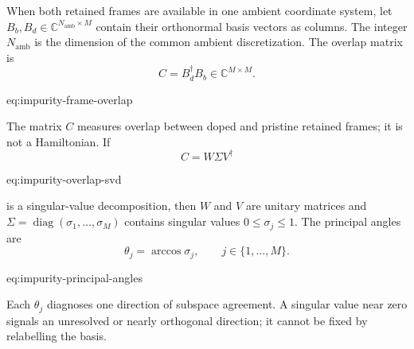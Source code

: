 When both retained frames are available in one ambient coordinate system, let
$B_b,B_d\in\mathbb C^{N_{\mathrm{amb}}\times M}$ contain their orthonormal
basis vectors as columns. The integer $N_{\mathrm{amb}}$ is the dimension of
the common ambient discretization. The overlap matrix is
\begin{equation}
    C=B_d^{\dagger}B_b\in\mathbb C^{M\times M}.
    \label{eq:impurity-frame-overlap}
\end{equation}
\begin{equationterms}{eq:impurity-frame-overlap}
\end{equationterms}
The matrix $C$ measures overlap between doped and pristine retained frames; it
is not a Hamiltonian. If
\begin{equation}
    C=W\Sigma V^{\dagger}
    \label{eq:impurity-overlap-svd}
\end{equation}
\begin{equationterms}{eq:impurity-overlap-svd}
\end{equationterms}
is a singular-value decomposition, then $W$ and $V$ are unitary matrices and
$\Sigma=\operatorname{diag}(\sigma_1,\ldots,\sigma_M)$ contains singular values
$0\leq\sigma_j\leq1$. The principal angles are
\begin{equation}
    \theta_j=\arccos\sigma_j,
    \qquad j\in\{1,\ldots,M\}.
    \label{eq:impurity-principal-angles}
\end{equation}
\begin{equationterms}{eq:impurity-principal-angles}
\end{equationterms}
Each $\theta_j$ diagnoses one direction of subspace agreement. A singular value
near zero signals an unresolved or nearly orthogonal direction; it cannot be
fixed by relabelling the basis.

